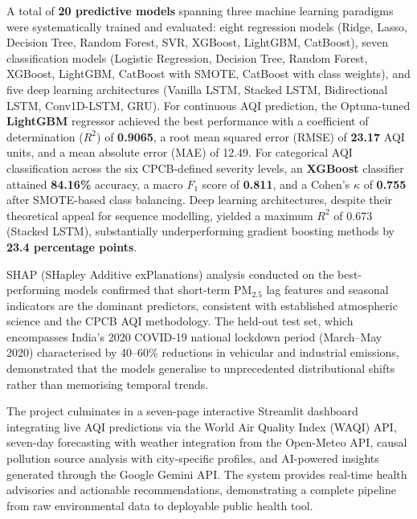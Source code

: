 \documentclass[12pt,a4paper]{report}
\begin{document}
A total of \textbf{20 predictive models} spanning three machine learning paradigms were systematically trained and evaluated: eight regression models (Ridge, Lasso, Decision Tree, Random Forest, SVR, XGBoost, LightGBM, CatBoost), seven classification models (Logistic Regression, Decision Tree, Random Forest, XGBoost, LightGBM, CatBoost with SMOTE, CatBoost with class weights), and five deep learning architectures (Vanilla LSTM, Stacked LSTM, Bidirectional LSTM, Conv1D-LSTM, GRU). For continuous AQI prediction, the Optuna-tuned \textbf{LightGBM} regressor achieved the best performance with a coefficient of determination ($R^2$) of \textbf{0.9065}, a root mean squared error (RMSE) of \textbf{23.17} AQI units, and a mean absolute error (MAE) of 12.49. For categorical AQI classification across the six CPCB-defined severity levels, an \textbf{XGBoost} classifier attained \textbf{84.16\%} accuracy, a macro $F_1$ score of \textbf{0.811}, and a Cohen's $\kappa$ of \textbf{0.755} after SMOTE-based class balancing. Deep learning architectures, despite their theoretical appeal for sequence modelling, yielded a maximum $R^2$ of 0.673 (Stacked LSTM), substantially underperforming gradient boosting methods by \textbf{23.4 percentage points}.

SHAP (SHapley Additive exPlanations) analysis conducted on the best-performing models confirmed that short-term PM$_{2.5}$ lag features and seasonal indicators are the dominant predictors, consistent with established atmospheric science and the CPCB AQI methodology. The held-out test set, which encompasses India's 2020 COVID-19 national lockdown period (March--May 2020) characterised by 40--60\% reductions in vehicular and industrial emissions, demonstrated that the models generalise to unprecedented distributional shifts rather than memorising temporal trends.

The project culminates in a seven-page interactive Streamlit dashboard integrating live AQI predictions via the World Air Quality Index (WAQI) API, seven-day forecasting with weather integration from the Open-Meteo API, causal pollution source analysis with city-specific profiles, and AI-powered insights generated through the Google Gemini API. The system provides real-time health advisories and actionable recommendations, demonstrating a complete pipeline from raw environmental data to deployable public health tool.

\clearpage
\thispagestyle{empty}
\mbox{}
\end{document}
